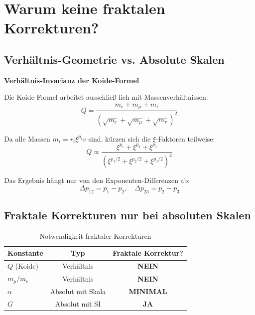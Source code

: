 	\section{Warum keine fraktalen Korrekturen?}
	
	\subsection{Verhältnis-Geometrie vs. Absolute Skalen}
	
	\begin{theorem}
		\textbf{Verhältnis-Invarianz der Koide-Formel}
		
		Die Koide-Formel arbeitet ausschließ lich mit Massenverhältnissen:
		\begin{equation}
			Q = \frac{m_e + m_\mu + m_\tau}{(\sqrt{m_e} + \sqrt{m_\mu} + \sqrt{m_\tau})^2}
		\end{equation}
		
		Da alle Massen $m_i = r_i \xi^{p_i} v$ sind, kürzen sich die $\xi$-Faktoren teilweise:
		\begin{equation}
			Q \propto \frac{\xi^{p_1} + \xi^{p_2} + \xi^{p_3}}{(\xi^{p_1/2} + \xi^{p_2/2} + \xi^{p_3/2})^2}
		\end{equation}
		
		Das Ergebnis hängt nur von den Exponenten-Differenzen ab:
		\begin{equation}
			\Delta p_{12} = p_1 - p_2, \quad \Delta p_{23} = p_2 - p_3
		\end{equation}
	\end{theorem}
	
	\subsection{Fraktale Korrekturen nur bei absoluten Skalen}
	
	\begin{table}[h]
		\centering
		\begin{tabular}{lcc}
			\toprule
			\textbf{Konstante} & \textbf{Typ} & \textbf{Fraktale Korrektur?} \\
			\midrule
			$Q$ (Koide) & Verhältnis & \textbf{NEIN} \\
			$m_p/m_e$ & Verhältnis & \textbf{NEIN} \\
			$\alpha$ & Absolut mit Skala & \textbf{MINIMAL} \\
			$G$ & Absolut mit SI & \textbf{JA} \\
			\bottomrule
		\end{tabular}
		\caption{Notwendigkeit fraktaler Korrekturen}
	\end{table}
	
